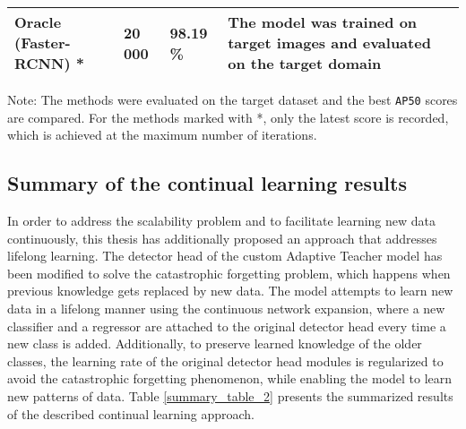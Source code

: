 \begin{table}
\begin{tabularx}{0.95\textwidth}{|X|X|X|X|}
        \hline
        Oracle (Faster-RCNN) \cite{ima} * & 20 000 & 98.19 \% & \multicolumn{1}{m{3cm}|}{The model was trained on target images and evaluated on the target domain} \\
        \hline
\end{tabularx}
\begin{tablenotes}
      \small
      \item Note: The methods were evaluated on the target dataset and the best \texttt{AP50} scores are compared. For the methods marked with *, only the latest score is recorded, which is achieved at the maximum number of  iterations. 
    \end{tablenotes}
\end{table}
\FloatBarrier 

\subsection{Summary of the continual learning results}

In order to address the scalability problem and to facilitate learning new data continuously, this thesis has additionally proposed an approach that addresses lifelong learning. The detector head of the custom Adaptive Teacher model has been modified to solve the catastrophic forgetting problem, which happens when previous knowledge gets replaced by new data. The model attempts to learn new data in a lifelong manner using the continuous network expansion, where a new classifier and a regressor are attached to the original detector head every time a new class is added. Additionally, to preserve learned knowledge of the older classes, the learning rate of the original detector head modules is regularized to avoid the catastrophic forgetting phenomenon, while enabling the model to learn new patterns of data. Table \ref{summary_table_2} presents the summarized results of the described continual learning approach.  


